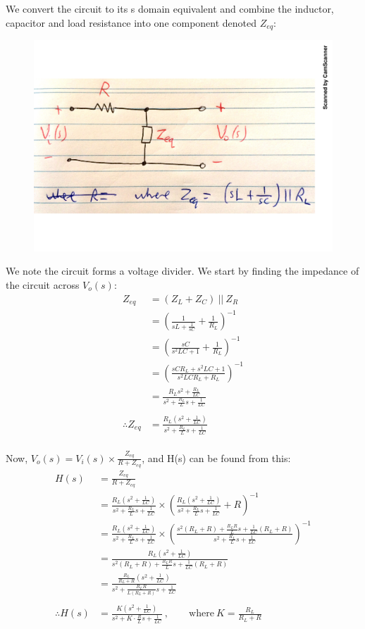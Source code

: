 We convert the circuit to its s domain equivalent and combine the inductor, capacitor and load resistance into one component denoted $Z_{eq}$:
\begin{figure}[H]
	\centering
	\includegraphics[scale=0.415]{q6.pdf}
\end{figure}
We note the circuit forms a voltage divider. We start by finding the impedance of the circuit across $V_o(s)$:
\begin{align*}
	Z_{eq} &= (Z_L + Z_C) \ || \ Z_R \\
	&= \left(\frac{1}{sL + \frac{1}{sC}} + \frac{1}{R_L} \right)^{-1} \\
	&= \left(\frac{sC}{s^2LC + 1} + \frac{1}{R_L} \right)^{-1} \\
	&= \left(\frac{sCR_L + s^2LC + 1}{s^2LCR_L + R_L} \right)^{-1} \\
	&= \frac{R_Ls^2 + \frac{R_L}{LC}}{s^2 + \frac{R_L}{L}s + \frac{1}{LC}} \\
	\\
	\therefore Z_{eq} &= \frac{R_L \left(s^2 + \frac{1}{LC} \right)}{s^2 + \frac{R_L}{L}s + \frac{1}{LC}}
\end{align*}
\\
Now, $V_o(s) = V_i(s)\times\frac{Z_{eq}}{R+Z_{eq}}$, and H(s) can be found from this:
\begin{align*}
	H(s) &= \frac{Z_{eq}}{R+Z_{eq}} \\
	&= \frac{R_L \left(s^2 + \frac{1}{LC} \right)}{s^2 + \frac{R_L}{L}s + \frac{1}{LC}} \times \left(\frac{R_L \left(s^2 + \frac{1}{LC} \right)}{s^2 + \frac{R_L}{L}s + \frac{1}{LC}} + R \right)^{-1} \\
	&= \frac{R_L \left(s^2 + \frac{1}{LC} \right)}{s^2 + \frac{R_L}{L}s + \frac{1}{LC}} \times \left(\frac{s^2(R_L+R) + \frac{R_LR}{L}s + \frac{1}{LC}(R_L + R)}{s^2 + \frac{R_L}{L}s + \frac{1}{LC}} \right)^{-1} \\
	&= \frac{R_L \left(s^2 + \frac{1}{LC} \right)}{s^2(R_L+R) + \frac{R_LR}{L}s + \frac{1}{LC}(R_L + R)} \\
	&= \frac{\frac{R_L}{R_L + R} \left(s^2 + \frac{1}{LC} \right)}{s^2 + \frac{R_LR}{L(R_L + R)}s + \frac{1}{LC}} \\
	\\
	\therefore H(s) &= \frac{K \left(s^2 + \frac{1}{LC} \right)}{s^2 + K \cdot \frac{R}{L}s + \frac{1}{LC}} \ , \qquad \mathrm{where} \  K = \frac{R_L}{R_L+R}
\end{align*}
